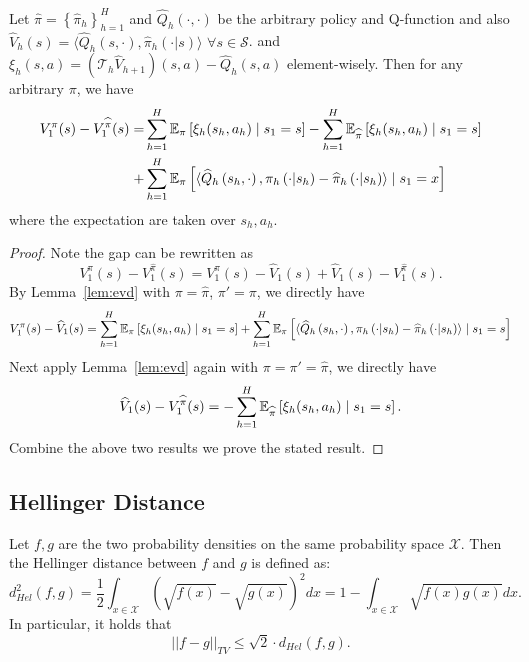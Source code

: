 \begin{lemma}\label{lem:decompose_difference} 
	Let $\widehat{\pi}=\left\{\widehat{\pi}_{h}\right\}_{h=1}^{H}$ and $\widehat{Q}_h(\cdot,\cdot)$ be the arbitrary policy and Q-function and also $\widehat{V}_h(s)=\langle \widehat{Q}_h(s,\cdot),\widehat{\pi}_h(\cdot|s)\rangle$ $\forall s\in\mathcal{S}$.  and $\xi_h(s,a)=(\mathcal{T}_h\widehat{V}_{h+1})(s,a)-\widehat{Q}_h(s,a)$ element-wisely. Then for any arbitrary $\pi$, we have 
	\begin{align*}
	V_1^{\pi}(s)-V_1^{\widehat{\pi}}(s)=&\sum_{h=1}^H\mathbb{E}_{\pi}\left[\xi_h(s_h,a_h)\mid s_1=s\right]-\sum_{h=1}^H\mathbb{E}_{\widehat{\pi}}\left[\xi_h(s_h,a_h)\mid s_1=s\right]\\
	+&\sum_{h=1}^{H} \mathbb{E}_{\pi}\left[\langle\widehat{Q}_{h}\left(s_{h}, \cdot\right), \pi_{h}\left(\cdot | s_{h}\right)-\widehat{\pi}_{h}\left(\cdot | s_{h}\right)\rangle \mid s_{1}=x\right]
	\end{align*}
	where the expectation are taken over $s_h,a_h$.
\end{lemma}

\begin{proof}
	Note the gap can be rewritten as 
	\[
	V_1^{\pi}(s)-V_1^{\widehat{\pi}}(s)=V_1^{\pi}(s)-\widehat{V}_1(s)+\widehat{V}_1(s)-V_1^{\widehat{\pi}}(s).
	\]
	By Lemma~\ref{lem:evd} with $\pi=\widehat{\pi}$, $\pi'=\pi$, we directly have 
	\begin{equation}\label{eqn:inter1}
	V_1^{\pi}(s)-\widehat{V}_1(s)=\sum_{h=1}^H\mathbb{E}_{\pi}\left[\xi_h(s_h,a_h)\mid s_1=s\right]
	+\sum_{h=1}^{H} \mathbb{E}_{\pi}\left[\langle\widehat{Q}_{h}\left(s_{h}, \cdot\right), \pi_{h}\left(\cdot | s_{h}\right)-\widehat{\pi}_{h}\left(\cdot | s_{h}\right)\rangle \mid s_{1}=s\right]
	\end{equation}
	Next apply Lemma~\ref{lem:evd} again with $\pi=\pi'=\widehat{\pi}$, we directly have 
	\begin{equation}\label{eqn:inter2}
	\widehat{V}_1(s)-V_1^{\widehat{\pi}}(s)=-\sum_{h=1}^H\mathbb{E}_{\widehat{\pi}}\left[\xi_h(s_h,a_h)\mid s_1=s\right].
	\end{equation}
	Combine the above two results we prove the stated result.
\end{proof}


\subsection{Hellinger Distance}

\begin{definition}\label{def:Hellinger}
	Let $f,g$ are the two probability densities on the same probability space $\mathcal{X}$. Then the Hellinger distance between $f$ and $g$ is defined as:
	\[
	d_{Hel}^2(f,g)=\frac{1}{2}\int_{x\in\mathcal{X}}\left(\sqrt{f(x)}-\sqrt{g(x)}\right)^2dx=1-\int_{x\in\mathcal{X}}\sqrt{f(x)g(x)}dx.
	\]
	In particular, it holds that 
	\[
	\lvert\lvert f-g\rvert\rvert_{TV}\leq \sqrt{2}\cdot d_{Hel}(f,g).
	\]
	
\end{definition}

